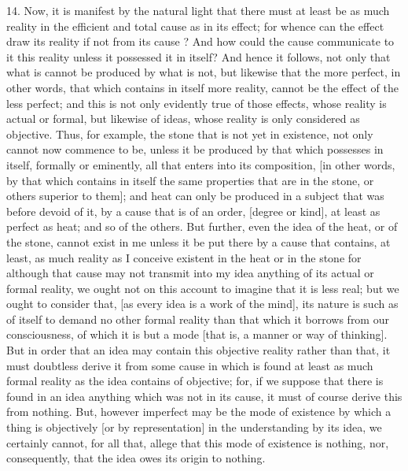 14. Now, it is manifest by the natural light that there must at least be as much reality in the efficient and total cause as in its effect; for whence can the effect draw its reality if not from its cause ? And how could the cause communicate to it this reality unless it possessed it in itself? And hence it follows, not only that what is cannot be produced by what is not, but likewise that the more perfect, in other words, that which contains in itself more reality, cannot be the effect of the less perfect; and this is not only evidently true of those effects, whose reality is actual or formal, but likewise of ideas, whose reality is only considered as objective. Thus, for example, the stone that is not yet in existence, not only cannot now commence to be, unless it be produced by that which possesses in itself, formally or eminently, all that enters into its composition, [in other words, by that which contains in itself the same properties that are in the stone, or others superior to them]; and heat can only be produced in a subject that was before devoid of it, by a cause that is of an order, [degree or kind], at least as perfect as heat; and so of the others. But further, even the idea of the heat, or of the stone, cannot exist in me unless it be put there by a cause that contains, at least, as much reality as I conceive existent in the heat or in the stone for although that cause may not transmit into my idea anything of its actual or formal reality, we ought not on this account to imagine that it is less real; but we ought to consider that, [as every idea is a work of the mind], its nature is such as of itself to demand no other formal reality than that which it borrows from our consciousness, of which it is but a mode [that is, a manner or way of thinking]. But in order that an idea may contain this objective reality rather than that, it must doubtless derive it from some cause in which is found at least as much formal reality as the idea contains of objective; for, if we suppose that there is found in an idea anything which was not in its cause, it must of course derive this from nothing. But, however imperfect may be the mode of existence by which a thing is objectively [or by representation] in the understanding by its idea, we certainly cannot, for all that, allege that this mode of existence is nothing, nor, consequently, that the idea owes its origin to nothing.

